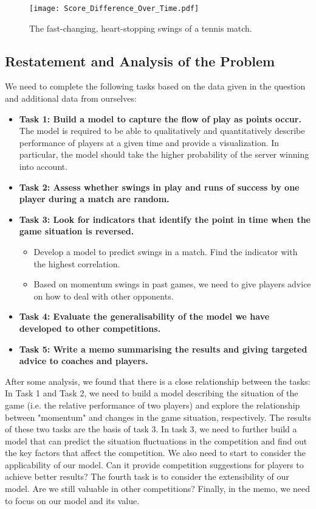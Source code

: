 \documentclass{mcmthesis}
\begin{document}
\begin{figure}[h] 
  \centering
  \texttt{[image: Score\_Difference\_Over\_Time.pdf]}
  \caption{The fast-changing, heart-stopping swings of a tennis match.} \label{fig1}
  \end{figure}

  \subsection{Restatement and Analysis of the Problem}

  We need to complete the following tasks based on the data given in the question and
  additional data from ourselves:
  \begin{itemize}
    \item \textbf{Task 1: Build a model to capture the flow of play as points occur.} 
    The model is required to be able to qualitatively and quantitatively describe 
    performance of players at a given time and provide a visualization. In particular,
    the model should take the higher probability of the server winning into account.
    \item \textbf{Task 2: Assess whether swings in play and runs of success by one player during a match 
    are random.}
    \item \textbf{Task 3: Look for indicators that identify the point in time when the game situation is reversed.}
    \begin{itemize}
      \item Develop a model to predict swings in a match. Find the indicator with the highest correlation.
      \item Based on momentum swings in past games, we need to give players advice on how to deal with other opponents.
    \end{itemize}
    \item \textbf{Task 4: Evaluate the generalisability of the model we have developed to other competitions.}
    \item \textbf{Task 5: Write a memo summarising the results and giving targeted advice to coaches and players.}
  \end{itemize}

After some analysis, we found that there is a close relationship between the tasks: In Task
1 and Task 2, we need to build a model describing the situation of the game (i.e. the relative
performance of two players) and explore the relationship between "momentum" and changes in
the game situation, respectively. The results of these two tasks are the basis of task 3. In task
3, we need to further build a model that can predict the situation fluctuations in the competition
and find out the key factors that affect the competition. We also need to start to consider the
applicability of our model. Can it provide competition suggestions for players to achieve better
results? The fourth task is to consider the extensibility of our model. Are we still valuable in
other competitions? Finally, in the memo, we need to focus on our model and its value.
\end{document}
